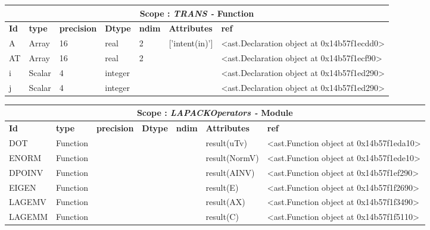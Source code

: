 \documentclass{report}
\begin{document}
 \vspace{1cm}

\begin{center}
\begin{longtable}{|p{3.5cm}|p{1.5cm}|p{1.5cm}|p{1.5cm}|p{1cm}|p{2cm}|p{4cm}| }
\hline
\multicolumn{7}{|c|}{\textbf{Scope : \qquad}  \textbf{\textit{TRANS - }Function}}\\ 
\hline
\textbf{Id} & \textbf{type} & \textbf{precision} & \textbf{Dtype} & \textbf{ndim} & \textbf{Attributes} & \textbf{ref} \\\hline

A & Array & 16 & real & 2 & ['intent(in)'] & <ast.Declaration object at 0x14b57f1ecdd0> \\\hline

AT & Array & 16 & real & 2 &  & <ast.Declaration object at 0x14b57f1ecf90> \\\hline

i & Scalar & 4 & integer &  &  & <ast.Declaration object at 0x14b57f1ed290> \\\hline

j & Scalar & 4 & integer &  &  & <ast.Declaration object at 0x14b57f1ed290> \\\hline

\end{longtable}
\end{center}

 \vspace{1cm}

\begin{center}
\begin{longtable}{|p{3.5cm}|p{1.5cm}|p{1.5cm}|p{1.5cm}|p{1cm}|p{2cm}|p{4cm}| }
\hline
\multicolumn{7}{|c|}{\textbf{Scope : \qquad}  \textbf{\textit{LAPACKOperators - }Module}}\\ 
\hline
\textbf{Id} & \textbf{type} & \textbf{precision} & \textbf{Dtype} & \textbf{ndim} & \textbf{Attributes} & \textbf{ref} \\\hline

DOT & Function &  &  &  & result(uTv) & <ast.Function object at 0x14b57f1eda10> \\\hline

ENORM & Function &  &  &  & result(NormV) & <ast.Function object at 0x14b57f1ede10> \\\hline

DPOINV & Function &  &  &  & result(AINV) & <ast.Function object at 0x14b57f1ef290> \\\hline

EIGEN & Function &  &  &  & result(E) & <ast.Function object at 0x14b57f1f2690> \\\hline

LAGEMV & Function &  &  &  & result(AX) & <ast.Function object at 0x14b57f1f3490> \\\hline

LAGEMM & Function &  &  &  & result(C) & <ast.Function object at 0x14b57f1f5110> \\\hline

\end{longtable}
\end{center}
\end{document}
